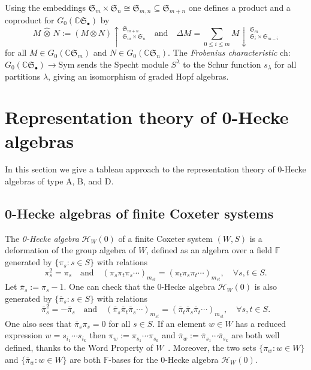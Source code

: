 \documentclass{amsart}
\newtheorem*{Young's Rule}{Young's Rule}
\theoremstyle{definition}
\theoremstyle{remark}
\numberwithin{equation}{section}
\begin{document}
Using the embeddings ${{\mathfrak S}}_m\times{{\mathfrak S}}_n\cong {{\mathfrak S}}_{m,n}\subseteq {{\mathfrak S}}_{m+n}$ one defines a product and a coproduct for $G_0({{\mathbb C}}{{\mathfrak S}}_\bullet)$ by 
\[
M\,\widehat\otimes\, N := (M\otimes N)\uparrow\,_{{{\mathfrak S}}_m\times{{\mathfrak S}}_n}^{{{\mathfrak S}}_{m+n}} 
\quad\text{and}\quad
\Delta M = \sum_{0\le i\le m} M\downarrow\,_{{{\mathfrak S}}_i\times{{\mathfrak S}}_{m-i}}^{{{\mathfrak S}}_m}
\] 
for all $M\in G_0({{\mathbb C}}{{\mathfrak S}}_m)$ and $N\in G_0({{\mathbb C}}{{\mathfrak S}}_n)$. 
The \emph{Frobenius characteristic} ch: $G_0({{\mathbb C}}{{\mathfrak S}}_\bullet)\to{\mathrm{Sym}}$ sends the Specht module $S^\lambda$ to the Schur function $s_\lambda$ for all partitions $\lambda$, giving an isomorphism of graded Hopf algebras.

\section{Representation theory of 0-Hecke algebras}\label{sec:rep}

In this section we give a tableau approach to the representation theory of 0-Hecke algebras of type A, B, and D.

\subsection{0-Hecke algebras of finite Coxeter systems}\label{sec:HW0}
The \emph{0-Hecke algebra} ${\mathcal{H}}_W(0)$ of a finite Coxeter system $(W,S)$ is a deformation of the group algebra of $W$, defined as an algebra over a field ${{\mathbb F}}$ generated by $\{\pi_s:s\in S\}$ with relations
\[ \pi_s^2 = \pi_s \quad\text{and}\quad (\pi_s\pi_t\pi_s\cdots)_{m_{st}} = (\pi_t\pi_s\pi_t\cdots)_{m_{st}}, \quad \forall s, t \in S. \]
Let ${\overline{\pi}}_s := \pi_s-1$. One can check that the 0-Hecke algebra ${\mathcal{H}}_W(0)$ is also generated by $\{{\overline{\pi}}_s:s\in S\}$ with relations
\[ {\overline{\pi}}_s^2 = -{\overline{\pi}}_s \quad\text{and}\quad ({\overline{\pi}}_s{\overline{\pi}}_t{\overline{\pi}}_s\cdots)_{m_{st}} = ({\overline{\pi}}_t{\overline{\pi}}_s{\overline{\pi}}_t\cdots)_{m_{st}}, \quad \forall s, t \in S. \]
One also sees that ${\overline{\pi}}_s\pi_s=0$ for all $s\in S$. If an element $w\in W$ has a reduced expression $w=s_{i_1}\cdots s_{i_k}$ then $\pi_w:=\pi_{s_1}\cdots\pi_{s_k}$ and ${\overline{\pi}}_w:={\overline{\pi}}_{s_1}\cdots{\overline{\pi}}_{s_k}$ are both well defined, thanks to the Word Property of $W$~\cite[Theorem~3.3.1]{BjornerBrenti}. Moreover, the two sets $\{\pi_w:w\in W\}$ and $\{{\overline{\pi}}_w:w\in W\}$ are both ${{\mathbb F}}$-bases for the 0-Hecke algebra ${\mathcal{H}}_W(0)$.
\end{document}
